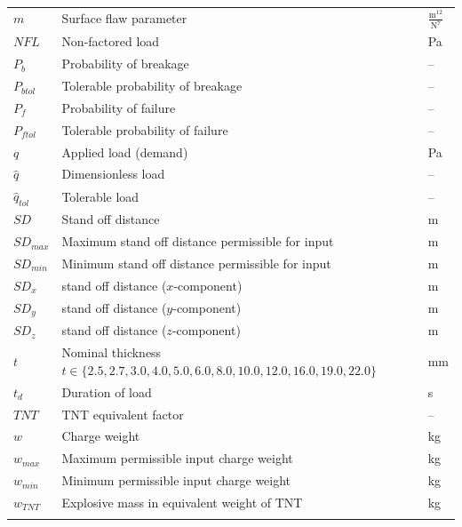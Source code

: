 \documentclass[12pt]{article}
\begin{document}
\begin{longtabu}{l X[l] l}
$m$ & Surface flaw parameter & $\frac{\text{m}^{12}}{\text{N}^{7}}$
\\
$NFL$ & Non-factored load & Pa
\\
${P_{b}}$ & Probability of breakage & --
\\
${P_{btol}}$ & Tolerable probability of breakage & --
\\
${P_{f}}$ & Probability of failure & --
\\
${P_{ftol}}$ & Tolerable probability of failure & --
\\
$q$ & Applied load (demand) & Pa
\\
$\hat{q}$ & Dimensionless load & --
\\
${\hat{q}_{tol}}$ & Tolerable load & --
\\
$SD$ & Stand off distance & m
\\
${SD_{max}}$ & Maximum stand off distance permissible for input & m
\\
${SD_{min}}$ & Minimum stand off distance permissible for input & m
\\
${SD_{x}}$ & stand off distance ($x$-component) & m
\\
${SD_{y}}$ & stand off distance ($y$-component) & m
\\
${SD_{z}}$ & stand off distance ($z$-component) & m
\\
$t$ & Nominal thickness $t\in{}\{2.5,2.7,3.0,4.0,5.0,6.0,8.0,10.0,12.0,16.0,19.0,22.0\}$ & mm
\\
${t_{d}}$ & Duration of load & s
\\
$TNT$ & TNT equivalent factor & --
\\
$w$ & Charge weight & kg
\\
${w_{max}}$ & Maximum permissible input charge weight & kg
\\
${w_{min}}$ & Minimum permissible input charge weight & kg
\\
${w_{TNT}}$ & Explosive mass in equivalent weight of TNT & kg
\\
\bottomrule
\caption{}
\label{Table:ToS}
\end{longtabu}
\end{document}
